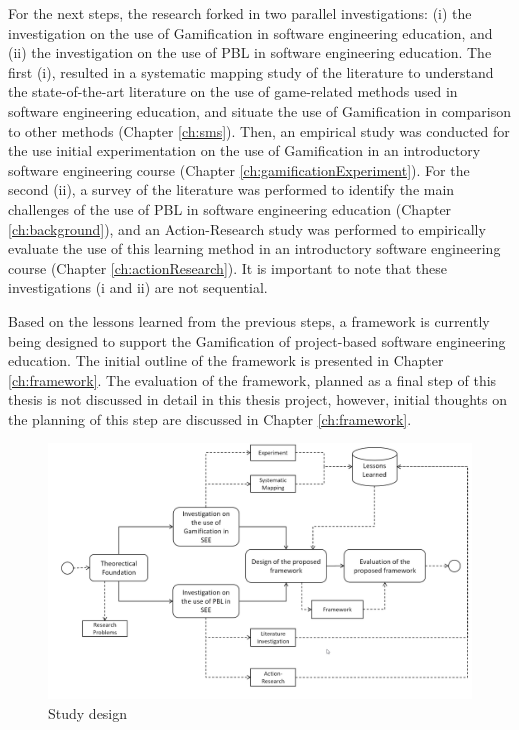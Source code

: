 For the next steps, the research forked in two parallel investigations: (i) the investigation on the use of Gamification in software engineering education, and (ii) the investigation on the use of PBL in software engineering education. The first (i), resulted in a systematic mapping study of the literature to understand the state-of-the-art literature on the use of game-related methods used in software engineering education, and situate the use of Gamification in comparison to other methods (Chapter \ref{ch:sms}). Then, an empirical study was conducted for the use initial experimentation on the use of Gamification in an introductory software engineering course (Chapter \ref{ch:gamificationExperiment}). For the second (ii), a survey of the literature was performed to identify the main challenges of the use of PBL in software engineering education (Chapter \ref{ch:background}), and an Action-Research study was performed to empirically evaluate the use of this learning method in an introductory software engineering course (Chapter \ref{ch:actionResearch}). It is important to note that these investigations (i and ii) are not sequential.
 
Based on the lessons learned from the previous steps, a framework is currently being designed to support the Gamification of project-based software engineering education. The initial outline of the framework is presented in Chapter \ref{ch:framework}. The evaluation of the framework, planned as a final step of this thesis is not discussed in detail in this thesis project, however, initial thoughts on the planning of this step are discussed in Chapter \ref{ch:framework}.

\begin{figure}[!h]%
\centering
\includegraphics[width=1\textwidth]{img/method.png}
\caption{Study design}
\label{fig:method}
\end{figure} 

